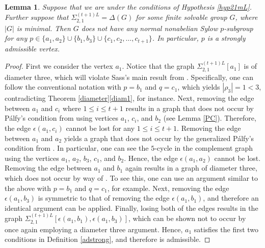 \documentclass[11pt]{amsart}
\newtheorem{lemma}[theorem]{Lemma}
\theoremstyle{definition}
\theoremstyle{remark}
\numberwithin{equation}{section}
\newcommand{\SLi}[3]{\Sigma_{#1,#2}^{#3L}} %
\begin{document}
\begin{lemma}\label{lem21ad}
Suppose that we are under the conditions of Hypothesis \ref{hyp21mL}. Further suppose that $\SLi{2}{1}{(t+1)}=\Delta(G)$ for some finite solvable group $G$, where $|G|$ is minimal. Then $G$ does not have any normal nonabelian Sylow $p$-subgroup for any $p\in\{a_1,a_2\}\cup\{b_1,b_3\}\cup\{c_1,c_2,\ldots,c_{t+1}\}$. In particular, $p$ is a strongly admissible vertex.
\end{lemma}
\begin{proof}
First we consider the vertex $a_1$. Notice that the graph $\SLi{2}{1}{(t+1)}[a_1]$ is of diameter three, which will violate Sass's main result from \cite{S}. Specifically, one can follow the conventional notation with $p=b_1$ and $q=c_1$, which yields $|\rho_3|=1<3$, contradicting Theorem \ref{diameter}\eqref{diam1}, for instance. Next, removing the edge between $a_1$ and $c_i$ where $1\leq i\leq t+1$ results in a graph that does not occur by P\'alfy's condition from \cite{P} using vertices $a_1$, $c_i$, and $b_2$ (see Lemma \ref{PC}). Therefore, the edge $\epsilon(a_1,c_i)$ cannot be lost for any $1\leq i\leq t+1$. Removing the edge between $a_1$ and $a_2$ yields a graph that does not occur by the generalized P\'alfy's condition from \cite{A}. In particular, one can see the $5$-cycle in the complement graph using the vertices $a_1$, $a_2$, $b_3$, $c_1$, and $b_2$. Hence, the edge $\epsilon(a_1,a_2)$ cannot be lost. Removing the edge between $a_1$ and $b_1$ again results in a graph of diameter three, which does not occur by way of \cite{S}. To see this, one can use an argument similar to the above with $p=b_1$ and $q=c_1$, for example. Next, removing the edge $\epsilon(a_1,b_3)$ is symmetric to that of removing the edge $\epsilon(a_1,b_1)$, and therefore an identical argument can be applied. Finally, losing both of the edges results in the graph $\SLi{2}{1}{(t+1)}[\epsilon(a_1, b_1), \epsilon(a_1, b_3)]$, which can be shown not to occur by once again employing a diameter three argument. Hence, $a_1$ satisfies the first two conditions in Definition \ref{adstrong}, and therefore is admissible.


\end{proof}
\end{document}
